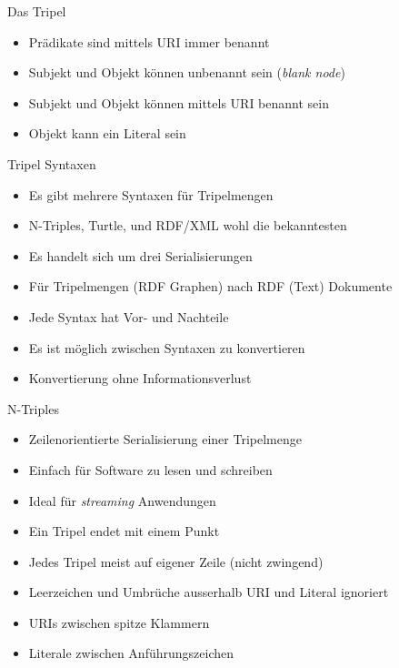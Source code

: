 \documentclass{beamer}
\begin{document}
\begin{frame}{Das Tripel}
	
	\begin{itemize}
		\item Prädikate sind mittels URI immer benannt
		\item Subjekt und Objekt können unbenannt sein (\emph{blank node})
		\item Subjekt und Objekt können mittels URI benannt sein
		\item Objekt kann ein Literal sein
	\end{itemize}
	
\end{frame}

\begin{frame}{Tripel Syntaxen}
	
	\begin{itemize}
		\item Es gibt mehrere Syntaxen für Tripelmengen
		\item N-Triples, Turtle, und RDF/XML wohl die bekanntesten
		\item Es handelt sich um drei Serialisierungen 
		\item Für Tripelmengen (RDF Graphen) nach RDF (Text) Dokumente
		\item Jede Syntax hat Vor- und Nachteile
		\item Es ist möglich zwischen Syntaxen zu konvertieren
		\item Konvertierung ohne Informationsverlust
	\end{itemize}
	
\end{frame}

\begin{frame}{N-Triples}
	
	\begin{itemize}
		\item Zeilenorientierte Serialisierung einer Tripelmenge
		\item Einfach für Software zu lesen und schreiben
		\item Ideal für \emph{streaming} Anwendungen
		\item Ein Tripel endet mit einem Punkt
		\item Jedes Tripel meist auf eigener Zeile (nicht zwingend)
		\item Leerzeichen und Umbrüche ausserhalb URI und Literal ignoriert
		\item URIs zwischen spitze Klammern 
		\item Literale zwischen Anführungszeichen
	\end{itemize}
	
\end{frame}
\end{document}
